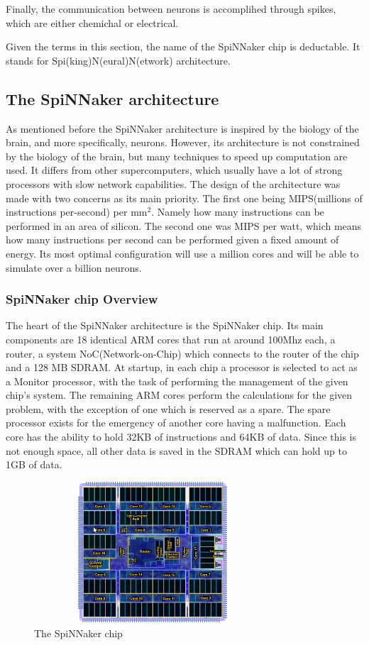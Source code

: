 \documentclass[12pt,a4paper]{article}
\begin{document}
Finally, the communication between neurons is accomplihed through spikes, which are either chemichal or electrical\cite{gerstner2002spiking}.

Given the terms in this section, the name of the SpiNNaker chip is deductable. It stands for Spi(king)N(eural)N(etwork) architecture.
\subsection{The SpiNNaker architecture}
As mentioned before the SpiNNaker architecture is inspired by the biology of the brain, and more specifically, neurons. However, its architecture is not constrained by the biology of the brain, but many techniques to speed up computation are used. It differs from other supercomputers, which  usually have a lot of strong processors with slow network capabilities. The design of the architecture was made with two concerns as its main priority. The first one being MIPS(millions of instructions per-second) per mm$^2$. Namely how many instructions can be performed in an area of silicon. The second one was MIPS per watt, which means how many instructions per second can be performed given a fixed amount of energy. Its most optimal configuration will use a million cores and will be able to simulate over a billion neurons\cite{furber2007neural}.
\subsubsection {SpiNNaker chip Overview}
The heart of the SpiNNaker architecture is the SpiNNaker chip. Its main components are 18 identical ARM cores that run at around 100Mhz each, a router, a system NoC(Network-on-Chip) which connects to the router of the chip and a 128 MB SDRAM. At startup, in each chip a processor is selected to act as a Monitor processor, with the task of performing the management of the given chip's system. The remaining ARM cores perform the calculations for the given problem, with the exception of one which is reserved as a spare. The spare processor exists for the emergency of another core having a malfunction\cite{furber2007neural}. Each core has the ability to hold 32KB of instructions and 64KB of data. Since this is not enough space, all other data is saved in the SDRAM which can hold up to 1GB of data\cite{navaridas2009understanding}.
\begin{figure}[h!]
\includegraphics[width=250pt,height=150pt,scale=2]{Pics/chip.png}
\centering
\caption{The SpiNNaker chip\cite{spinnweb}}
\end{figure}
\end{document}
